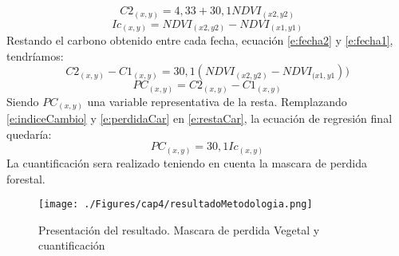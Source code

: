 		\begin{equation}
						\label{e:fecha2}
		C2_{(x,y)}=4,33+30,1 NDVI_{(x2,y2)}
		\end{equation}
		\begin{equation}
		\label{e:indiceCambio}
		Ic_{(x,y)}=NDVI_{(x2,y2)} -NDVI_{(x1,y1)}
		\end{equation}		
Restando el carbono obtenido entre cada fecha, ecuación \ref{e:fecha2} y \ref{e:fecha1}, tendr\'iamos:
		\begin{equation}
				\label{e:restaCar}
		C2_{(x,y)} - C1_{(x,y)}= 30,1(NDVI_{(x2,y2)}-NDVI_{(x1,y1}))
		\end{equation}		
				\begin{equation}
				\label{e:perdidaCar}
					PC_{(x,y)} =C2_{(x,y)} - C1_{(x,y)}
				\end{equation}		
Siendo $ PC_{(x,y)}$ una variable representativa de la resta. Remplazando \ref{e:indiceCambio} y \ref{e:perdidaCar} en \ref{e:restaCar}, la ecuaci\'on de regresi\'on final quedar\'ia:
		\begin{equation}
			PC_{(x,y)} = 30,1 Ic_{(x,y)}
		\end{equation}
La cuantificaci\'on sera realizado teniendo en cuenta la mascara de perdida forestal.
\begin{figure}[H]
	\centering
	\texttt{[image: ./Figures/cap4/resultadoMetodologia.png]}
	\caption{Presentaci\'on del resultado. Mascara de perdida Vegetal y cuantificaci\'on}
	\label{fig:resulPC}
\end{figure}




